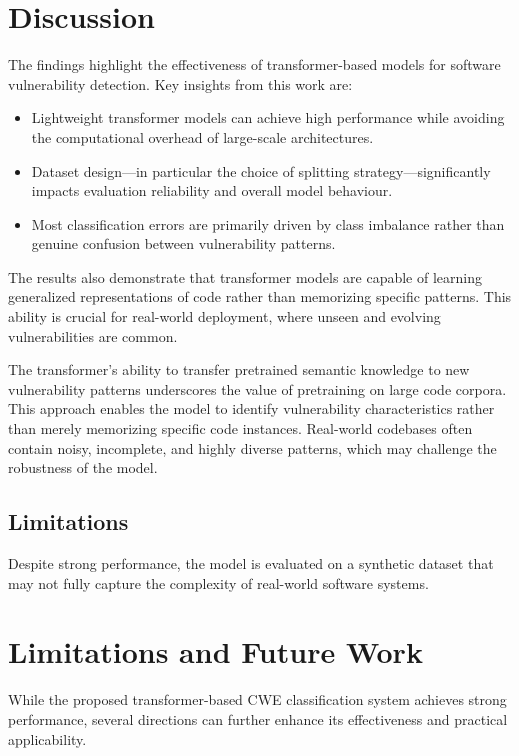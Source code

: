 \documentclass[conference]{IEEEtran}
\begin{document}
\section{Discussion}

The findings highlight the effectiveness of transformer-based models for software vulnerability detection. Key insights from this work are:
\begin{itemize}
    \item Lightweight transformer models can achieve high performance while avoiding the computational overhead of large-scale architectures.

    \item Dataset design---in particular the choice of splitting strategy---significantly impacts evaluation reliability and overall model behaviour.

    \item Most classification errors are primarily driven by class imbalance rather than genuine confusion between vulnerability patterns.
\end{itemize}
The results also demonstrate that transformer models are capable of learning generalized representations of code rather than memorizing specific patterns. This ability is crucial for real-world deployment, where unseen and evolving vulnerabilities are common.

The transformer's ability to transfer pretrained semantic knowledge to new vulnerability patterns underscores the value of pretraining on large code corpora. This approach enables the model to identify vulnerability characteristics rather than merely memorizing specific code instances.
 Real-world codebases often contain noisy, incomplete, and highly diverse patterns, which may challenge the robustness of the model.
\subsection{Limitations}

Despite strong performance, the model is evaluated on a synthetic dataset that may not fully capture the complexity of real-world software systems.
\section{Limitations and Future Work}
While the proposed transformer-based CWE classification system achieves strong performance, several directions can further enhance its effectiveness and practical applicability.
\end{document}
